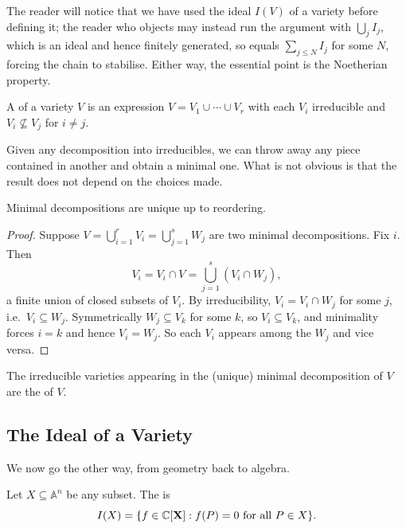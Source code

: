 \documentclass[a4paper]{scrartcl}
\newcommand{\A}{\mathbb{A}}
\begin{document}
The reader will notice that we have used the ideal $I(V)$ of a variety before defining it; the reader who objects may instead run the argument with $\bigcup_j I_j$, which is an ideal and hence finitely generated, so equals $\sum_{j \leq N} I_j$ for some $N$, forcing the chain to stabilise. Either way, the essential point is the Noetherian property.

\begin{definition}
	A  of a variety $V$ is an expression $V = V_1 \cup \cdots \cup V_r$ with each $V_i$ irreducible and $V_i \not\subseteq V_j$ for $i \neq j$.
\end{definition}

Given any decomposition into irreducibles, we can throw away any piece contained in another and obtain a minimal one. What is not obvious is that the result does not depend on the choices made.

\begin{proposition}
	Minimal decompositions are unique up to reordering.
\end{proposition}

\begin{proof}
	Suppose $V = \bigcup_{i=1}^r V_i = \bigcup_{j=1}^s W_j$ are two minimal decompositions. Fix $i$. Then
	$$V_i = V_i \cap V = \bigcup_{j=1}^s (V_i \cap W_j),$$
	a finite union of closed subsets of $V_i$. By irreducibility, $V_i = V_i \cap W_j$ for some $j$, i.e.\ $V_i \subseteq W_j$. Symmetrically $W_j \subseteq V_k$ for some $k$, so $V_i \subseteq V_k$, and minimality forces $i = k$ and hence $V_i = W_j$. So each $V_i$ appears among the $W_j$ and vice versa.
\end{proof}

\begin{definition}
	The irreducible varieties appearing in the (unique) minimal decomposition of $V$ are the  of $V$.
\end{definition}

\subsection{The Ideal of a Variety}\label{subsec:ideals}

We now go the other way, from geometry back to algebra.

\begin{definition}
	Let $X \subseteq \A^n$ be any subset. The  is
	$$I(X) = \{f \in \mathbb{C}[\mathbf{X}] : f(P) = 0 \text{ for all } P \in X\}.$$
\end{definition}
\end{document}
